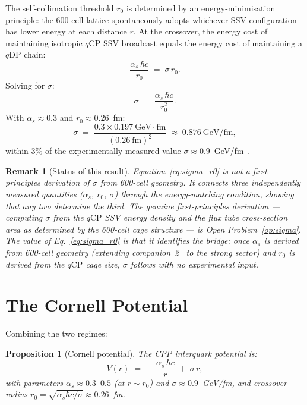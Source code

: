 \documentclass[12pt]{article}
\newtheorem{proposition}[theorem]{Proposition}
\newtheorem{remark}[theorem]{Remark}
\newcommand{\qCP}{q\mathrm{CP}}
\newcommand{\qDP}{q\mathrm{DP}}
\newcommand{\as}{\alpha_s}
\begin{document}
The self-collimation threshold $r_0$ is determined by an
energy-minimisation principle: the 600-cell lattice spontaneously
adopts whichever SSV configuration has lower energy at each
distance $r$. At the crossover, the energy cost of maintaining
isotropic $\qCP$ SSV broadcast equals the energy cost of maintaining
a $\qDP$ chain:
\begin{equation}
\frac{\as\,\hbar c}{r_0} \;=\; \sigma\,r_0.
\label{eq:energy_match}
\end{equation}
Solving for $\sigma$:
\begin{equation}
\boxed{\sigma \;=\; \frac{\as\,\hbar c}{r_0^2}.}
\label{eq:sigma_r0}
\end{equation}
With $\as \approx 0.3$ and $r_0 \approx 0.26$~fm:
\begin{equation}
\sigma \;=\; \frac{0.3 \times 0.197\ \mathrm{GeV\cdot fm}}{(0.26\ \mathrm{fm})^2}
\;\approx\; 0.876\ \mathrm{GeV/fm},
\label{eq:sigma_numerical}
\end{equation}
within 3\% of the experimentally measured value
$\sigma \approx 0.9$~GeV/fm~\cite{bali2001}.

\begin{remark}[Status of this result]
Equation~\eqref{eq:sigma_r0} is not a first-principles derivation
of $\sigma$ from 600-cell geometry. It connects three independently
measured quantities ($\as$, $r_0$, $\sigma$) through the
energy-matching condition, showing that any two determine the third.
The genuine first-principles derivation — computing $\sigma$ from
the $\qCP$ SSV energy density and the flux tube cross-section area
as determined by the 600-cell cage structure — is Open
Problem~\ref{op:sigma}. The value of Eq.~\eqref{eq:sigma_r0} is
that it identifies the bridge: once $\as$ is derived from 600-cell
geometry (extending companion~2~\cite{c2} to the strong sector) and
$r_0$ is derived from the $\qCP$ cage size, $\sigma$ follows with
no experimental input.
\end{remark}

\section{The Cornell Potential}
\label{sec:cornell}

Combining the two regimes:

\begin{proposition}[Cornell potential]
\label{prop:cornell}
The CPP interquark potential is:
\begin{equation}
\boxed{V(r) \;=\; -\frac{\as\,\hbar c}{r} \;+\; \sigma\,r,}
\label{eq:cornell}
\end{equation}
with parameters $\as \approx 0.3$--$0.5$ (at $r \sim r_0$) and
$\sigma \approx 0.9$~GeV/fm, and crossover radius
$r_0 = \sqrt{\as\hbar c/\sigma} \approx 0.26$~fm.
\end{proposition}
\end{document}
